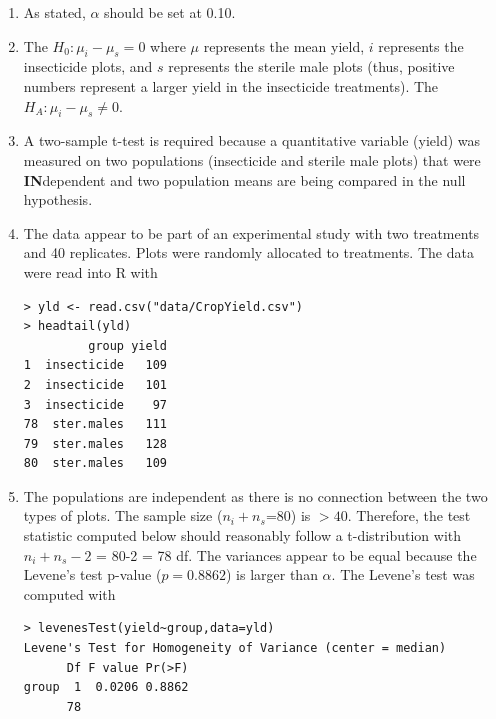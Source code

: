 \documentclass[10pt,openany]{book}\usepackage[]{graphicx}\usepackage[]{color}
\makeatletter
\newenvironment{kframe}{%
 \def\at@end@of@kframe{}%
 \ifinner\ifhmode%
  \def\at@end@of@kframe{\end{minipage}}%
  \begin{minipage}{\columnwidth}%
 \fi\fi%
 \def\FrameCommand##1{\hskip\@totalleftmargin \hskip-\fboxsep
 \colorbox{shadecolor}{##1}\hskip-\fboxsep
     \hskip-\linewidth \hskip-\@totalleftmargin \hskip\columnwidth}%
 \MakeFramed {\advance\hsize-\width
   \@totalleftmargin\z@ \linewidth\hsize
   \@setminipage}}%
 {\par\unskip\endMakeFramed%
 \at@end@of@kframe}
\newenvironment{knitrout}{}{} %
\makeatother
\begin{document}
\begin{itemize}
    \begin{enumerate}
      \item As stated, $\alpha$ should be set at 0.10.
      \item The $H_{0}:\mu_{i}-\mu_{s}=0$ where $\mu$ represents the mean yield, $i$ represents the insecticide plots, and $s$ represents the sterile male plots (thus, positive numbers represent a larger yield in the insecticide treatments).  The $H_{A}:\mu_{i}-\mu_{s}\neq0$.
      \item A two-sample t-test is required because a quantitative variable (yield) was measured on two populations (insecticide and sterile male plots) that were \textbf{IN}dependent and two population means are being compared in the null hypothesis.
      \item The data appear to be part of an experimental study with two treatments and 40 replicates.  Plots were randomly allocated to treatments.  The data were read into R with
\begin{knitrout}
\color{fgcolor}\begin{kframe}
\begin{verbatim}
> yld <- read.csv("data/CropYield.csv")
> headtail(yld)
         group yield
1  insecticide   109
2  insecticide   101
3  insecticide    97
78  ster.males   111
79  ster.males   128
80  ster.males   109
\end{verbatim}
\end{kframe}
\end{knitrout}
      \item The populations are independent as there is no connection between the two types of plots.  The sample size ($n_{i}+n_{s}$=80) is $>40$.  Therefore, the test statistic computed below should reasonably follow a t-distribution with $n_{i}+n_{s}-2$ = 80-2 = 78 df.  The variances appear to be equal because the Levene's test p-value ($p=0.8862$) is larger than $\alpha$.  The Levene's test was computed with
\begin{knitrout}
\color{fgcolor}\begin{kframe}
\begin{verbatim}
> levenesTest(yield~group,data=yld)
Levene's Test for Homogeneity of Variance (center = median)
      Df F value Pr(>F)
group  1  0.0206 0.8862
      78               
\end{verbatim}
\end{kframe}
\end{knitrout}

\end{enumerate}
\end{itemize}
\end{document}
